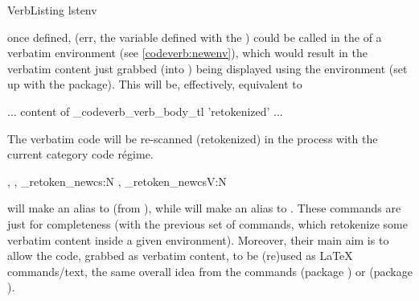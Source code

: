 \documentclass[10pt]{article}
\begin{document}
\begin{codestore}
    {
    }
    {}
  
  \cvRetokenEnvNewCommand 
    {VerbListing} {lstenv}
\end{codestore}


once defined, \tsobj{\VerbListingV}  (err, the variable defined with the ) could be called in the  of a verbatim environment (see \ref{codeverb:newenv}), which would result in the verbatim content just grabbed (into ) being displayed using the  environment (set up with the  package). This will be, effectively, equivalent to
\begin{codestore}
  \begin{lstenv}
    ... content of \g_codeverb_verb_body_tl 'retokenized' ...
  \end{lstenv}
\end{codestore}


\begin{tsremark}
  The verbatim code will be re-scanned (retokenized) in the process with the current category code régime.
\end{tsremark}

\begin{codedescribe}{ \cvRetokenNewCommand , \cvRetokenNewCommandV , \codeverb_retoken_newcs:N , \codeverb_retoken_newcsV:N  }
\begin{codesyntax}%
\end{codesyntax}
 will make  an alias to  (from ), while   will make  an alias to . These commands are just for completeness (with the previous set of commands, which retokenize some verbatim content inside a given environment). Moreover, their main aim is to allow  the code, grabbed as verbatim content, to be (re)used as \LaTeX{} commands/text, the same overall idea from the commands \tsobj{\getstored} (package ) or \tsobj{\tsexec} (package ).
\end{codedescribe}
\end{document}
